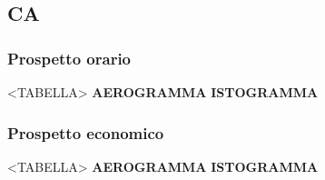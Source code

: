 \subsection{CA}

\subsubsection{Prospetto orario}

<TABELLA>
\textbf{AEROGRAMMA}
\textbf{ISTOGRAMMA}

\subsubsection{Prospetto economico}

<TABELLA>
\textbf{AEROGRAMMA}
\textbf{ISTOGRAMMA}

